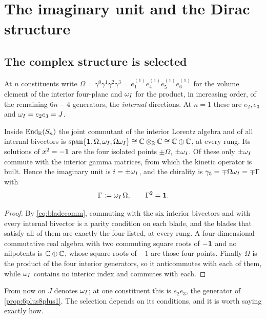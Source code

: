 \section{The imaginary unit and the Dirac structure}
\label{sec:dirac}

\subsection{The complex structure is selected}

At $n$ constituents write $\Omega=\gamma^0\gamma^1\gamma^2\gamma^3=e^{(1)}_1e^{(1)}_4e^{(1)}_5e^{(1)}_6$ for the volume element of the
interior four-plane and $\omega_I$ for the product, in increasing order, of the remaining $6n-4$ generators, the \emph{internal}
directions. At $n=1$ these are $e_2,e_3$ and $\omega_I=e_2e_3=J$.

\begin{theorem}
\label{thm:i}
Inside $\operatorname{End}_{\mathbb{R}}(S_n)$ the joint commutant of the interior Lorentz algebra and of all internal bivectors is
$\operatorname{span}\{\mathbf 1,\Omega,\omega_I,\Omega\omega_I\}\cong\mathbb{C}\otimes_{\mathbb{R}}\mathbb{C}\cong\mathbb{C}\oplus\mathbb{C}$, at every rung. Its solutions of
$x^2=-\mathbf 1$ are the four isolated points $\pm\Omega$, $\pm\omega_I$. Of these only $\pm\omega_I$ commute with the interior gamma
matrices, from which the kinetic operator is built. Hence the imaginary unit is $i=\pm\omega_I$, and the chirality is
$\gamma_5=\mp\Omega\omega_I=\mp\Gamma$ with
\[
\Gamma:=\omega_I\,\Omega,\qquad \Gamma^2=\mathbf 1 .
\]
\end{theorem}

\begin{proof}
By \eqref{eq:bladecomm}, commuting with the six interior bivectors and with every internal bivector is a parity condition on
each blade, and the blades that satisfy all of them are exactly the four listed, at every rung. A four-dimensional
commutative real algebra with two commuting square roots of $-\mathbf 1$ and no nilpotents is $\mathbb{C}\oplus\mathbb{C}$, whose square roots of
$-1$ are those four points. Finally $\Omega$ is the product of the four interior generators, so it anticommutes with each of
them, while $\omega_I$ contains no interior index and commutes with each.
\end{proof}

From now on $J$ denotes $\omega_I$; at one constituent this is $e_2e_3$, the generator of \cref{prop:6plus8plus1}. The selection
depends on its conditions, and it is worth saying exactly how.

